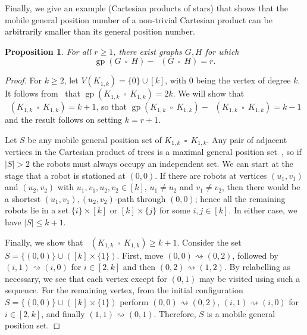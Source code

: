 \documentclass[a4paper,12pt]{article}
\DeclareMathOperator{\mob}{Mob_{gp}}
\DeclareMathOperator{\gp}{gp}
\DeclareMathOperator{\cp}{\,\square\,}
\newcommand{\gpo}{\gp_{\rm o}}
\newtheorem{proposition}[theorem]{Proposition}
\theoremstyle{definition}
\newcommand{\move}{\rightsquigarrow}
\begin{document}
	Finally, we give an example (Cartesian products of stars) that shows that the mobile general position number of a non-trivial Cartesian product can be arbitrarily smaller than its general position number. 
	
	\begin{proposition}
		For all $r \geq 1$, there exist graphs $G, H$ for which \[ \gp(G \cp H) - \mob(G \cp H) = r.\]
	\end{proposition}
	
	\begin{proof}
		For $k \geq 2$, let $V(K_{1,k}) = \{0\} \cup [k]$, with $0$ being the vertex of degree $k$. It follows from~\cite[Theorem 1]{tian-2021b} that $\gp (K_{1,k} \cp K_{1,k}) = 2k$. We will show that $\mob(K_{1,k} \cp K_{1,k}) = k+1$, so that $\gp(K_{1,k} \cp K_{1,k}) - \mob(K_{1,k} \cp K_{1,k}) = k-1$ and the result follows on setting $k = r+1$.
		
		Let $S$ be any mobile general position set of $K_{1,k} \cp K_{1,k}$. Any pair of adjacent vertices in the Cartesian product of trees is a maximal general position set~\cite{Welton}, so if $|S| > 2$ the robots must always occupy an independent set. We can start at the stage that a robot is stationed at $(0,0)$. If there are robots at vertices $(u_1,v_1)$ and $(u_2,v_2)$ with $u_1,v_1,u_2,v_2 \in [k]$, $u_1 \neq u_2$ and $v_1 \neq v_2$, then there would be a shortest $(u_1,v_1),(u_2,v_2)$-path through $(0,0)$; hence all the remaining robots lie in a set $\{ i\} \times [k]$ or $[k] \times \{ j\}$ for some $i,j \in [k]$. In either case, we have $|S| \leq k+1$.
		
		Finally, we show that $\mob(K_{1,k} \cp K_{1,k}) \geq k+1$. Consider the set $S = \{ (0,0) \} \cup ([k] \times \{ 1\} )$. First, move $(0,0) \move (0,2)$, followed by $(i,1) \move (i,0)$ for $i \in [2, k]$ and then $(0,2) \move (1,2)$. By relabelling as necessary, we see that each vertex except for $(0,1)$ may be visited using such a sequence. For the remaining vertex, from the initial configuration $S = \{ (0,0) \} \cup ([k] \times \{ 1\} )$ perform $(0,0) \move (0,2)$, $(i,1) \move (i,0)$ for $i \in [2,k]$, and finally $(1,1) \move (0,1)$. Therefore, $S$ is a mobile general position set.
	\end{proof}
	
	
	
	
	
\end{document}
